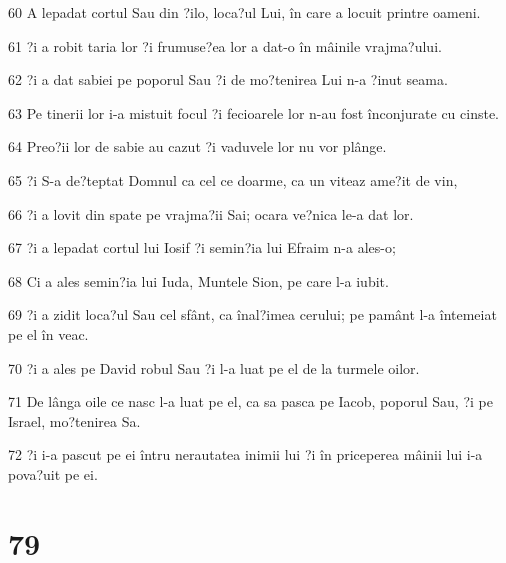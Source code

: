 \par 60 A lepadat cortul Sau din ?ilo, loca?ul Lui, în care a locuit printre oameni.
\par 61 ?i a robit taria lor ?i frumuse?ea lor a dat-o în mâinile vrajma?ului.
\par 62 ?i a dat sabiei pe poporul Sau ?i de mo?tenirea Lui n-a ?inut seama.
\par 63 Pe tinerii lor i-a mistuit focul ?i fecioarele lor n-au fost înconjurate cu cinste.
\par 64 Preo?ii lor de sabie au cazut ?i vaduvele lor nu vor plânge.
\par 65 ?i S-a de?teptat Domnul ca cel ce doarme, ca un viteaz ame?it de vin,
\par 66 ?i a lovit din spate pe vrajma?ii Sai; ocara ve?nica le-a dat lor.
\par 67 ?i a lepadat cortul lui Iosif ?i semin?ia lui Efraim n-a ales-o;
\par 68 Ci a ales semin?ia lui Iuda, Muntele Sion, pe care l-a iubit.
\par 69 ?i a zidit loca?ul Sau cel sfânt, ca înal?imea cerului; pe pamânt l-a întemeiat pe el în veac.
\par 70 ?i a ales pe David robul Sau ?i l-a luat pe el de la turmele oilor.
\par 71 De lânga oile ce nasc l-a luat pe el, ca sa pasca pe Iacob, poporul Sau, ?i pe Israel, mo?tenirea Sa.
\par 72 ?i i-a pascut pe ei întru nerautatea inimii lui ?i în priceperea mâinii lui i-a pova?uit pe ei.

\chapter{79}

